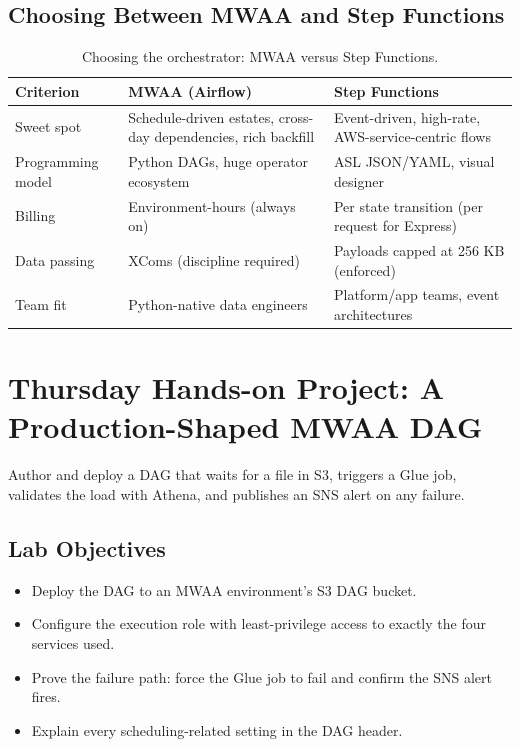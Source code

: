 \subsection{Choosing Between MWAA and Step Functions}
\begin{table}[H]
\centering
\small
\begin{tabular}{@{}p{3.4cm}p{4.4cm}p{4.4cm}@{}}
\toprule
\textbf{Criterion} & \textbf{MWAA (Airflow)} & \textbf{Step Functions} \\
\midrule
Sweet spot & Schedule-driven estates, cross-day dependencies, rich backfill & Event-driven, high-rate, AWS-service-centric flows \\
Programming model & Python DAGs, huge operator ecosystem & ASL JSON/YAML, visual designer \\
Billing & Environment-hours (always on) & Per state transition (per request for Express) \\
Data passing & XComs (discipline required) & Payloads capped at 256 KB (enforced) \\
Team fit & Python-native data engineers & Platform/app teams, event architectures \\
\bottomrule
\end{tabular}
\caption{Choosing the orchestrator: MWAA versus Step Functions.}
\label{tab:ch12-orchestrators}
\end{table}

\section{Thursday Hands-on Project: A Production-Shaped MWAA DAG}
Author and deploy a DAG that waits for a file in S3, triggers a Glue job, validates the load with Athena, and publishes an SNS alert on any failure.

\subsection*{Lab Objectives}
\begin{itemize}
    \item Deploy the DAG to an MWAA environment's S3 DAG bucket.
    \item Configure the execution role with least-privilege access to exactly the four services used.
    \item Prove the failure path: force the Glue job to fail and confirm the SNS alert fires.
    \item Explain every scheduling-related setting in the DAG header.
\end{itemize}

